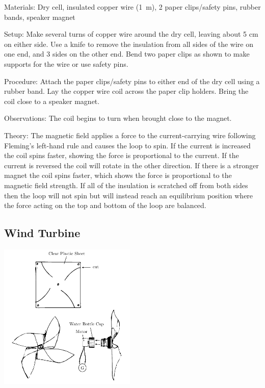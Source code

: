 \begin{multicols}{2}
\begin{description*}
\item[Materials:]{Dry cell, insulated copper wire (1~m), 2 paper clips/safety pins, rubber bands, speaker magnet}
\item[Setup:]{Make several turns of copper wire around the dry cell, leaving about 5 cm on either side. Use a knife to remove the insulation from all sides of the wire on one end, and 3 sides on the other end. Bend two paper clips as shown to make supports for the wire or use safety pins.}
\item[Procedure:]{Attach the paper clips/safety pins to either end of the dry cell using a rubber band. Lay the copper wire coil across the paper clip holders. Bring the coil close to a speaker magnet.}
\item[Observations:]{The coil begins to turn when brought close to the magnet.}
\item[Theory:]{The magnetic field applies a force to the current-carrying wire following Fleming's left-hand rule and causes the loop to spin. If the current is increased the coil spins faster, showing the force is proportional to the current. If the current is reversed the coil will rotate in the other direction. If there is a stronger magnet the coil spins faster, which shows the force is proportional to the magnetic field strength. If all of the insulation is scratched off from both sides then the loop will not spin but will instead reach an equilibrium position where the force acting on the top and bottom of the loop are balanced.}
\end{description*}

\columnbreak

\subsection{Wind Turbine}

\begin{center}
\includegraphics[width=0.49\textwidth]{./img/wind-turbine.png}
\end{center}


\end{multicols}
